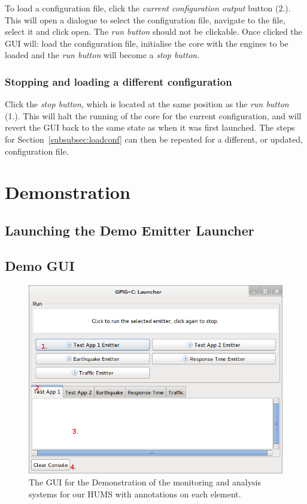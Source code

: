 \documentclass[10pt,a4paper]{article}
\begin{document}
To load a configuration file, click the \emph{current configuration output} button (2.). This will open a dialogue to select the configuration file, navigate to the file, select it and click open. The \emph{run button} should not be clickable. Once clicked the GUI will: load the configuration file, initialise the core with the engines to be loaded and the \emph{run button} will become a \emph{stop button}.

\subsubsection{Stopping and loading a different configuration}

Click the \emph{stop button}, which is located at the same position as the \emph{run button} (1.). This will halt the running of the core for the current configuration, and will revert the GUI back to the same state as when it was first launched. The steps for Section~\ref{subsubsec:loadconf} can then be repeated for a different, or updated, configuration file.

\section{Demonstration}
\label{subsec:demo}
\subsection{Launching the Demo Emitter Launcher}

\subsection{Demo GUI}
\begin{figure}[H]
  \centering
  \includegraphics[width=\textwidth]{images/demo-gui.png}
  \caption{The GUI for the Demonstration of the monitoring and analysis systems for our HUMS with annotations on each element.}
  \label{fig:demogui}
\end{figure}
\end{document}

